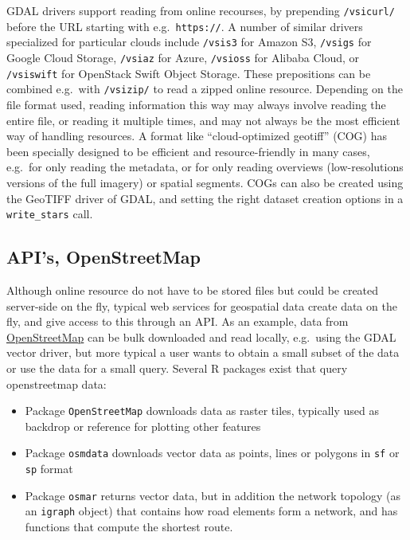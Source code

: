 \documentclass[]{book}
\providecommand{\tightlist}{%
  \setlength{\itemsep}{0pt}\setlength{\parskip}{0pt}}
\begin{document}
GDAL drivers support reading from online recourses, by prepending
\texttt{/vsicurl/} before the URL starting with e.g.~\texttt{https://}. A number of
similar drivers specialized for particular clouds include \texttt{/vsis3}
for Amazon S3, \texttt{/vsigs} for Google Cloud Storage, \texttt{/vsiaz} for
Azure, \texttt{/vsioss} for Alibaba Cloud, or \texttt{/vsiswift} for OpenStack
Swift Object Storage. These prepositions can be combined e.g.~with
\texttt{/vsizip/} to read a zipped online resource. Depending on the
file format used, reading information this way may always involve
reading the entire file, or reading it multiple times, and may not
always be the most efficient way of handling resources. A format
like ``cloud-optimized geotiff'' (COG) has been specially designed
to be efficient and resource-friendly in many cases, e.g.~for only
reading the metadata, or for only reading overviews (low-resolutions
versions of the full imagery) or spatial segments. COGs can also
be created using the GeoTIFF driver of GDAL, and setting the right
dataset creation options in a \texttt{write\_stars} call.

\hypertarget{apis-openstreetmap}{%
\subsection{API's, OpenStreetMap}\label{apis-openstreetmap}}

Although online resource do not have to be stored files but could be
created server-side on the fly, typical web services for geospatial
data create data on the fly, and give access to this through an API.
As an example, data from \href{https://openstreetmap.org/}{OpenStreetMap}
can be bulk downloaded and read locally, e.g.~using the GDAL vector
driver, but more typical a user wants to obtain a small subset of
the data or use the data for a small query. Several R packages exist
that query openstreetmap data:

\begin{itemize}
\tightlist
\item
  Package \texttt{OpenStreetMap} downloads data as raster tiles, typically
  used as backdrop or reference for plotting other features
\item
  Package \texttt{osmdata} downloads vector data as points, lines or polygons
  in \texttt{sf} or \texttt{sp} format
\item
  Package \texttt{osmar} returns vector data, but in addition the network
  topology (as an \texttt{igraph} object) that contains how road elements
  form a network, and has functions that compute the shortest route.
\end{itemize}
\end{document}
